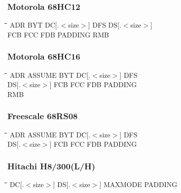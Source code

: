 \subsubsection{Motorola 68HC12}
{\tt\begin{tabbing}
\hspace{3cm}\=\hspace{3cm}\=\hspace{3cm}\=\hspace{3cm}\=\kill
ADR        \> BYT         \> DC[.$<$size$>$] \> DFS     \> DS[.$<$size$>$] \\
FCB        \> FCC         \> FDB         \> PADDING     \> RMB \\
\end{tabbing}}

\subsubsection{Motorola 68HC16}
{\tt\begin{tabbing}
\hspace{3cm}\=\hspace{3cm}\=\hspace{3cm}\=\hspace{3cm}\=\kill
ADR        \> ASSUME      \> BYT         \> DC[.$<$size$>$] \> DFS \\
DS[.$<$size$>$] FCB       \> FCC         \> FDB         \> PADDING \\
RMB \\
\end{tabbing}}

\subsubsection{Freescale 68RS08}
{\tt\begin{tabbing}
\hspace{3cm}\=\hspace{3cm}\=\hspace{3cm}\=\hspace{3cm}\=\kill
ADR        \> ASSUME      \> BYT         \> DC[.$<$size$>$] \> DFS \\
DS[.$<$size$>$] FCB       \> FCC         \> FDB         \> PADDING \\
\end{tabbing}}

\subsubsection{Hitachi H8/300(L/H)}
{\tt\begin{tabbing}
\hspace{3cm}\=\hspace{3cm}\=\hspace{3cm}\=\hspace{3cm}\=\kill
DC[.$<$size$>$] \> DS[.$<$size$>$] \> MAXMODE     \> PADDING \\
\end{tabbing}}

